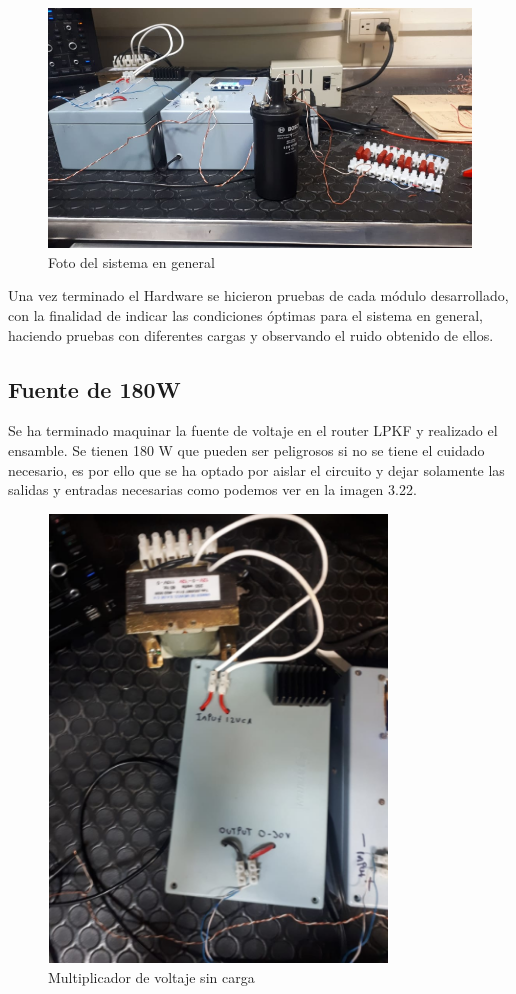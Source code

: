 \begin{figure}[H]
\centering
\includegraphics[width=12cm]{Capitulo3/figs/noimagen.png}
\caption{Foto del sistema en general}
\end{figure}

Una vez terminado el Hardware se hicieron pruebas de cada módulo desarrollado, con la finalidad de indicar las condiciones óptimas para el sistema en general, haciendo pruebas con diferentes cargas y observando el ruido obtenido de ellos. 

\subsection{Fuente de 180W}

Se ha terminado maquinar la fuente de voltaje en el router LPKF y realizado el ensamble. Se tienen 180 W que pueden ser peligrosos si no se tiene el cuidado necesario, es por ello que se ha optado por aislar el circuito y dejar solamente las salidas y entradas necesarias como podemos ver en la imagen 3.22.

\begin{figure}[H]
\centering
\includegraphics[width=9cm]{Capitulo3/figs/fotofuente.png}
\caption{Multiplicador de voltaje sin carga}
\end{figure}

